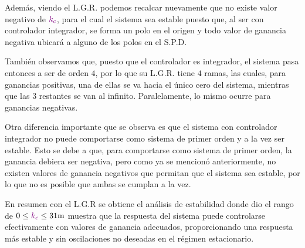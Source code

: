 Además, viendo el L.G.R. podemos recalcar nuevamente que no existe valor negativo de $\mathbin{\color{violet}k_{c}}$, para el cual el sistema sea estable puesto que, al ser con controlador integrador, se forma un polo en el origen y 
todo valor de ganancia negativa ubicará a alguno de los polos en el S.P.D.

También observamos que, puesto que el controlador es integrador, el sistema
pasa entonces a ser de orden $4$, por lo que su L.G.R. tiene $4$ ramas, las
cuales, para ganancias positivas, una de ellas se va hacia el único cero del
sistema, mientras que las $3$ restantes se van al infinito. Paralelamente, lo
mismo ocurre para ganancias negativas.

Otra diferencia importante que se observa es que el sistema con controlador
integrador no puede comportarse como sistema de primer orden y a la vez ser
estable. Esto se debe a que, para comportarse como sistema de primer orden,
la ganancia debiera ser negativa, pero como ya se mencionó anteriormente,
no existen valores de ganancia negativos que permitan que el sistema sea
estable, por lo que no es posible que ambas se cumplan a la vez.

En resumen con el L.G.R se obtiene el análisis de estabilidad donde dio el 
rango de \(0 \leq \mora{k_{c}} \leq 31\unit{m}\) muestra que la respuesta del 
sistema puede controlarse efectivamente con valores de ganancia adecuados, 
proporcionando una respuesta más estable y sin oscilaciones no deseadas en el 
régimen estacionario.


